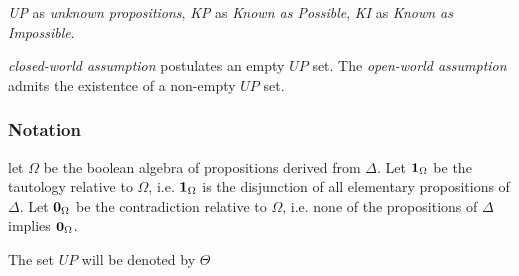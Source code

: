 \documentclass[11pt]{article}
\begin{document}
\emph{UP} as \emph{unknown propositions}, \emph{KP} as \emph{Known as Possible}, \emph{KI} as \emph{Known as
Impossible}.

\emph{closed-world assumption} postulates an empty \(UP\) set. The \emph{open-world
assumption} admits the existentce of a non-empty \(UP\) set.
\subsubsection{Notation}
\label{sec:org96b218e}
let \(\Omega\) be the boolean algebra of propositions derived from \(\Delta\). Let 
\(\boldsymbol{1}_\Omega\) be the tautology relative to \(\Omega\), i.e. \(\boldsymbol{1}_\Omega\) is
the disjunction of all elementary propositions of \(\Delta\). Let
\(\boldsymbol{0}_\Omega\) be the contradiction relative to \(\Omega\), i.e. none of the
propositions of \(\Delta\) implies \(\boldsymbol{0}_\Omega\). 

The set \(UP\) will be denoted by \(\Theta\)
\end{document}
